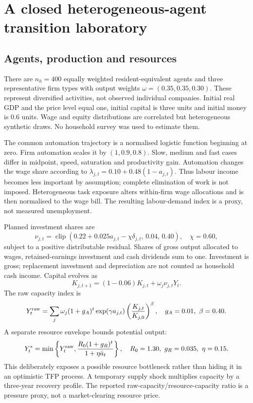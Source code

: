 \section{A closed heterogeneous-agent transition laboratory}
\subsection{Agents, production and resources}
There are $n_h=400$ equally weighted resident-equivalent agents and three representative firm types with output weights $\omega=(0.35,0.35,0.30)$. These represent diversified activities, not observed individual companies. Initial real GDP and the price level equal one, initial capital is three units and initial money is 0.6 units. Wage and equity distributions are correlated but heterogeneous synthetic draws. No household survey was used to estimate them.

The common automation trajectory is a normalised logistic function beginning at zero. Firm automation scales it by $(1,0.9,0.8)$. Slow, medium and fast cases differ in midpoint, speed, saturation and productivity gain. Automation changes the wage share according to $\lambda_{j,t}=0.10+0.48(1-a_{j,t})$. Thus labour income becomes less important by assumption; complete elimination of work is not imposed. Heterogeneous task exposure alters within-firm wage allocations and is then normalised to the wage bill. The resulting labour-demand index is a proxy, not measured unemployment.

Planned investment shares are
\begin{equation}
\nu_{j,t}=\operatorname{clip}(0.22+0.025a_{j,t}-\chi\delta_{j,t},\,0.04,\,0.40),\quad\chi=0.60,
\end{equation}
subject to a positive distributable residual. Shares of gross output allocated to wages, retained-earnings investment and cash dividends sum to one. Investment is gross; replacement investment and depreciation are not counted as household cash income. Capital evolves as
\begin{equation}
K_{j,t+1}=(1-0.06)K_{j,t}+\omega_j\nu_{j,t}Y_t.
\end{equation}
The raw capacity index is
\begin{equation}
Y_t^{\rm raw}=\sum_j\omega_j(1+g_A)^t\exp(\gamma a_{j,t})
\left(\frac{K_{j,t}}{K_{j,0}}\right)^{\beta},\quad g_A=0.01,\ \beta=0.40.
\end{equation}
A separate resource envelope bounds potential output:
\begin{equation}
Y_t^*=\min\left\{Y_t^{\rm raw},\frac{R_0(1+g_R)^t}{1+\eta\bar a_t}\right\},\quad
R_0=1.30,\ g_R=0.035,\ \eta=0.15.
\end{equation}
This deliberately exposes a possible resource bottleneck rather than hiding it in an optimistic TFP process. A temporary supply shock multiplies capacity by a three-year recovery profile. The reported raw-capacity/resource-capacity ratio is a pressure proxy, not a market-clearing resource price.

